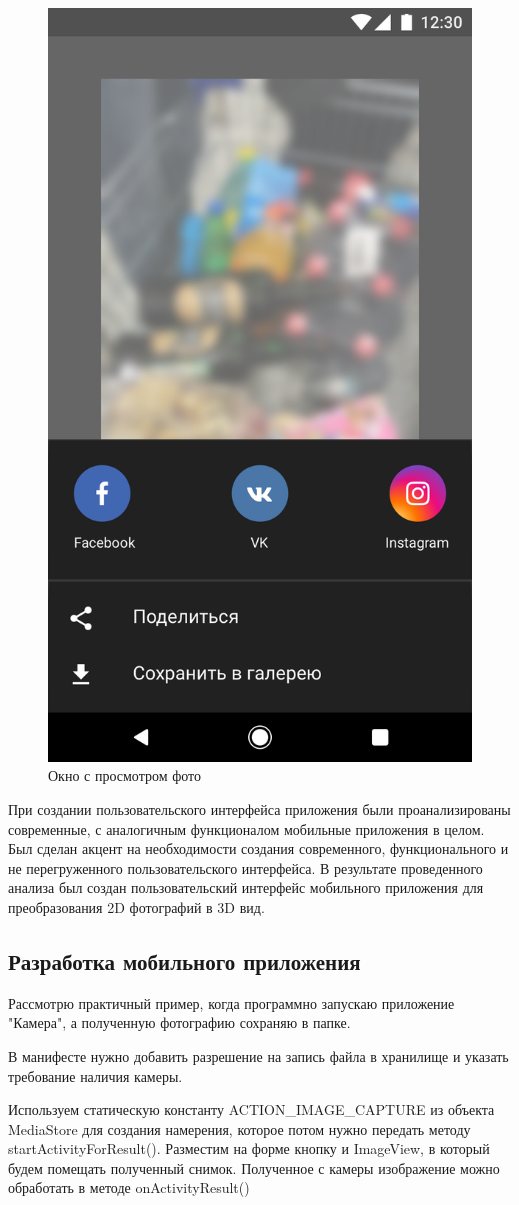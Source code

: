 \begin{figure}[H]
	\centering
	\includegraphics[width=0.6\linewidth]{pics/Artboard2}
	\caption{Окно с просмотром фото}
	\label{fig:Artboard2}
\end{figure}

При создании пользовательского интерфейса приложения были проанализированы современные, с аналогичным функционалом мобильные приложения в целом. Был сделан акцент на необходимости создания современного, функционального и не перегруженного пользовательского интерфейса. В результате проведенного анализа был создан пользовательский интерфейс мобильного приложения для преобразования 2D фотографий в 3D вид.

\subsection{Разработка мобильного приложения}

Рассмотрю практичный пример, когда программно запускаю приложение "Камера", а полученную фотографию сохраняю в папке.~\cite{camera}

В манифесте нужно добавить разрешение на запись файла в хранилище и указать требование наличия камеры.

Используем статическую константу ACTION\_IMAGE\_CAPTURE из объекта MediaStore для создания намерения, которое потом нужно передать методу startActivityForResult(). Разместим на форме кнопку и ImageView, в который будем помещать полученный снимок. Полученное с камеры изображение можно обработать в методе onActivityResult()

